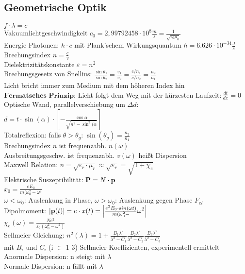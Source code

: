 \documentclass[fs, footer]{latex4ei}
\begin{document}
\begin{multicols*}{4}
\subsection{Geometrische Optik}
$f\cdot\lambda = c$\\
Vakuumlichtgeschwindigkeit $c_0=2,99792458\cdot 10^8 \frac{m}{s} = \frac{1}{\sqrt{\epsilon_0 \mu_0}}$\\
Energie Photonen: $h\cdot c$ mit Plank'schem Wirkungsquantum $h=6.626\cdot10^{-34}\frac{J}{s}$\\
Brechungsindex $n = \frac{c}{v}$\\
Dielektrizitätskonstante $\varepsilon = n^2 $\\
 Brechungsgesetz von Snellius: $\frac{\sin\theta_1}{\sin\theta_2} = \frac{v_1}{v_2}  = \frac{c/n_1}{c/n_2} = \frac{n_2}{n_1}$\\
Licht bricht immer zum Medium mit dem höheren Index hin\\
$\textbf{Fermatsches Prinzip}$: Licht folgt dem Weg mit der kürzesten Laufzeit$: \frac{dt}{dx} = 0$\\
Optische Wand, parallelverschiebung um $\Delta d:$\\$d = t\cdot\sin(\alpha)\cdot\left[-\frac{\cos\alpha}{\sqrt{n^2- \sin ^2(\alpha}}\right]$\\
Totalreflexion: falls $\theta>\theta_g$: $\sin(\theta_g) = \frac{n_2}{n_1}$\\

Brechungsindex $n$ ist frequenzabh. $n(\omega)$\\
Ausbreitungsgeschw. ist frequenzabh. $v(\omega)$ heißt Dispersion\\
Maxwell Relation: $n = \sqrt{\varepsilon_r\cdot \mu_r} \approx \sqrt{\varepsilon_r} = \sqrt{1+\chi_e}$\\ %
Elektrische Suszeptibilität: $\textbf{P} = N \cdot \textbf{p}$\\%
$x_0 = \frac{eE_0}{m(\omega_0^2-\omega^2}$\\
$\omega < \omega_0$: Auslenkung in Phase,
$\omega > \omega_0$: Auslenkung gegen Phase $F_{el}$\\
Dipolmoment: $|\textbf{p}(t)| = e\cdot x(t) = \left|\frac{e^2E_0\cdot sin(\omega t)}{m(\omega_0^2-}\omega^2\right|$\\ %
$\chi _e(\omega) = \frac{Ne^2}{\varepsilon_0(\omega_0^2 - \omega^2)}$\\
Sellmeier Gleichung: $n^2(\lambda) = 1 + \frac{B_1\lambda^2}{\lambda^2-C_1}\frac{B_2\lambda^2}{\lambda^2-C_2}\frac{B_3\lambda^2}{\lambda^2-C_3}$\\ mit $B_i$ und $C_i$ (i $\in$ 1-3) Sellmeier Koeffizienten, experimentell ermittelt\\
Anormale Dispersion: n steigt mit $\lambda$\\
Normale Dispersion: n fällt mit $\lambda$\\

\end{multicols*}
\end{document}
